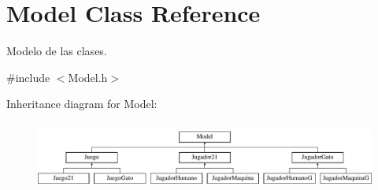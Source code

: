 \hypertarget{class_model}{}\section{Model Class Reference}
\label{class_model}


Modelo de las clases.  




{\ttfamily \#include $<$Model.\+h$>$}

Inheritance diagram for Model\+:\begin{figure}[H]
\begin{center}
\leavevmode
\includegraphics[height=2.258065cm]{class_model}
\end{center}
\end{figure}
